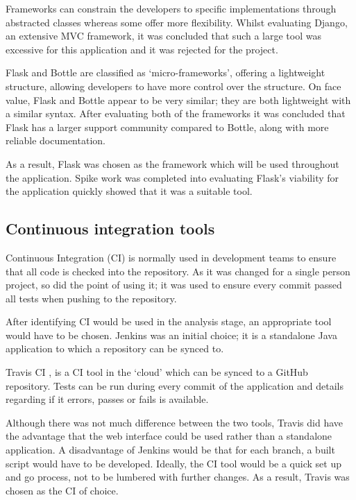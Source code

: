 Frameworks can constrain the developers to specific implementations through abstracted classes whereas some offer more flexibility. Whilst evaluating Django, an extensive MVC framework, it was concluded that such a large tool was excessive for this application and it was rejected for the project.

Flask and Bottle are classified as `micro-frameworks', offering a lightweight structure, allowing developers to have more control over the structure. On face value, Flask and Bottle appear to be very similar; they are both lightweight with a similar syntax. After evaluating both of the frameworks it was concluded that Flask has a larger support community compared to Bottle, along with more reliable documentation.

As a result, Flask was chosen as the framework which will be used throughout the application. Spike work was completed into evaluating Flask's viability for the application quickly showed that it was a suitable tool.

\subsection{Continuous integration tools} \label{tools:CI}
Continuous Integration (CI) is normally used in development teams to ensure that all code is checked into the repository. As it was changed for a single person project, so did the point of using it; it was used to ensure every commit passed all tests when pushing to the repository.

After identifying CI would be used in the analysis stage, an appropriate tool would have to be chosen. Jenkins \cite{citeulike:14023837} was an initial choice; it is a standalone Java application to which a repository can be synced to.

Travis CI \cite{citeulike:14023840}, is a CI tool in the `cloud' which can be synced to a GitHub repository. Tests can be run during every commit of the application and details regarding if it errors, passes or fails is available.

Although there was not much difference between the two tools, Travis did have the advantage that the web interface could be used rather than a standalone application. A disadvantage of Jenkins would be that for each branch, a built script would have to be developed. Ideally, the CI tool would be a quick set up and go process, not to be lumbered with further changes. As a result, Travis was chosen as the CI of choice.

